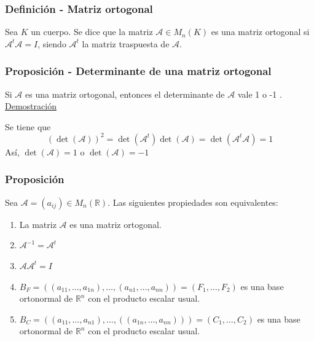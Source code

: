 \documentclass[12pt, a4paper, ones, notitlepage, openany,titlepage]{article}
\newcommand{\demostracion}{\noindent\underline{Demostración}}
\begin{document}
\subsubsection{Definición - Matriz ortogonal}
Sea $K$ un cuerpo. Se dice que la matriz $\mathcal{A} \in M_{n}(K)$ es una matriz ortogonal si $\mathcal{A}^{t} \mathcal{A}=I$, siendo $\mathcal{A}^{t}$ la matriz traspuesta de $\mathcal{A}$.

\subsubsection{Proposición - Determinante de una matriz ortogonal}
Si $\mathcal{A}$ es una matriz ortogonal, entonces el determinante de $\mathcal{A}$ vale 1 o -1 .\\

\demostracion

\noindent Se tiene que
$$
(\det(\mathcal{A}))^{2}=\det\left(\mathcal{A}^{t}\right) \det(\mathcal{A})=\det\left(\mathcal{A}^{t} \mathcal{A}\right)=1
$$
Así, $\det(\mathcal{A})=1$ o $\det(\mathcal{A})=-1$

\subsubsection{Proposición}
\noindent Sea $\mathcal{A}=\left(a_{i j}\right) \in M_{n}(\mathbb{R})$. Las siguientes propiedades son equivalentes:
\begin{enumerate}[label=(\arabic*)]
	\item La matriz $\mathcal{A}$ es una matriz ortogonal.
	\item $\mathcal{A}^{-1}=\mathcal{A}^{t}$
	\item $\mathcal{A} \mathcal{A}^{t}=I$
	\item $B_{F}=\left(\left(a_{11}, \ldots, a_{1 n}\right), \ldots,\left(a_{n 1}, \ldots, a_{n n}\right)\right) = \left(F_1,\ldots,F_2\right)$ es una base ortonormal de $\mathbb{R}^{n}$ con el producto escalar usual.
	\item $B_{C}=\left(\left(a_{11}, \ldots, a_{n 1}\right), \ldots,\left(\left(a_{1 n}, \ldots, a_{n n}\right)\right)\right) = \left(C_1,\ldots,C_2\right)$ es una base ortonormal de $\mathbb{R}^{n}$ con el producto escalar usual.
\end{enumerate}
\end{document}
